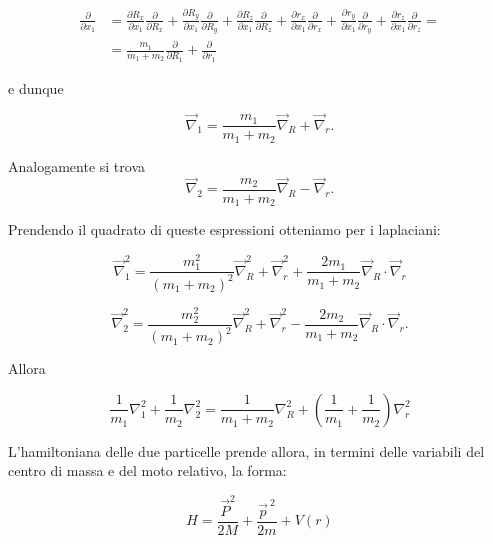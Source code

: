 \documentclass[a4paper,12pt,oneside]{book}
\begin{document}
\begin{equation} 
\begin{split}
\frac{\partial}{\partial x_1} & = \frac{\partial R_x}{\partial x_1} \frac{\partial}{\partial R_x}+\frac{\partial R_y}{\partial x_1} \frac{\partial}{\partial R_y}+\frac{\partial R_z}{\partial x_1} \frac{\partial}{\partial R_z}+\frac{\partial r_x}{\partial x_1} \frac{\partial}{\partial r_x}+\frac{\partial r_y}{\partial x_1} \frac{\partial}{\partial r_y}+\frac{\partial r_z}{\partial x_1} \frac{\partial}{\partial r_z}= \\
 & = \frac{m_1}{m_1+m_2}\frac{\partial}{\partial R_1}+\frac{\partial}{\partial r_1}
\end{split}
\end{equation}

e dunque

\begin{equation}
\vec{\nabla}_1=\frac{m_1}{m_1+m_2}\vec{\nabla}_R+\vec{\nabla}_r.
\end{equation}

Analogamente si trova
\begin{equation}
\vec{\nabla}_2=\frac{m_2}{m_1+m_2}\vec{\nabla}_R-\vec{\nabla}_r.
\end{equation}

Prendendo il quadrato di queste espressioni otteniamo per i laplaciani:

\begin{equation}
\vec{\nabla}_1^2=\frac{m_1^2}{\left(m_1+m_2\right)^2}\vec{\nabla}_R^2+\vec{\nabla}_r^2+\frac{2m_1}{m_1+m_2}\vec{\nabla}_R\cdot\vec{\nabla}_r
\end{equation}

\begin{equation}
\vec{\nabla}_2^2=\frac{m_2^2}{\left(m_1+m_2\right)^2}\vec{\nabla}_R^2+\vec{\nabla}_r^2-\frac{2m_2}{m_1+m_2}\vec{\nabla}_R\cdot\vec{\nabla}_r.
\end{equation}

Allora

\begin{equation}
\frac{1}{m_1}\nabla_1^2+\frac{1}{m_2}\nabla_2^2=\frac{1}{m_1+m_2}\nabla_R^2+\left(\frac{1}{m_1}+\frac{1}{m_2}\right)\nabla_r^2
\end{equation}

L'hamiltoniana delle due particelle prende allora, in termini delle variabili del centro di massa e del moto relativo, la forma:

\begin{equation}
H=\frac{\vec{P}^{2}}{2M}+\frac{\vec{p}^{\ 2}}{2m}+V\left(r\right)
\end{equation}
\end{document}
